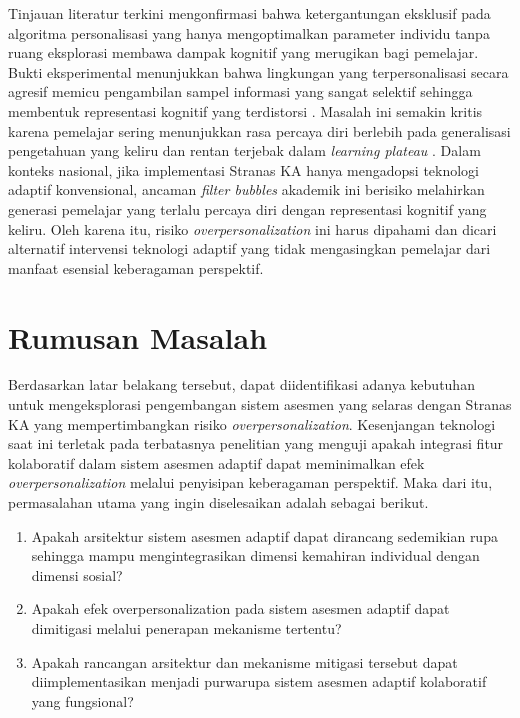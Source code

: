 Tinjauan literatur terkini mengonfirmasi bahwa ketergantungan eksklusif pada
algoritma personalisasi yang hanya mengoptimalkan parameter individu tanpa ruang
eksplorasi membawa dampak kognitif yang merugikan bagi pemelajar. Bukti
eksperimental menunjukkan bahwa lingkungan yang terpersonalisasi secara agresif
memicu pengambilan sampel informasi yang sangat selektif sehingga membentuk
representasi kognitif yang terdistorsi \autocite{Bahg2025}. Masalah ini semakin
kritis karena pemelajar sering menunjukkan rasa percaya diri berlebih pada generalisasi
pengetahuan yang keliru dan rentan terjebak dalam \textit{learning plateau}
\autocite{Bahg2025, Halkiopoulos2024}. Dalam konteks nasional, jika implementasi Stranas KA hanya mengadopsi teknologi adaptif konvensional, ancaman \textit{filter
bubbles} akademik ini berisiko melahirkan generasi pemelajar yang terlalu percaya diri dengan representasi kognitif yang keliru.
Oleh karena itu, risiko \textit{overpersonalization} ini harus dipahami dan dicari alternatif
intervensi teknologi adaptif yang tidak mengasingkan pemelajar dari manfaat esensial
keberagaman perspektif.

\section{Rumusan Masalah}
\label{sec:rumusan_masalah}
Berdasarkan latar belakang tersebut, dapat diidentifikasi adanya kebutuhan untuk
mengeksplorasi pengembangan sistem asesmen yang selaras dengan Stranas KA yang
mempertimbangkan risiko \textit{overpersonalization}. Kesenjangan teknologi saat ini terletak pada terbatasnya
penelitian yang menguji apakah integrasi fitur kolaboratif dalam sistem asesmen
adaptif dapat meminimalkan efek \textit{overpersonalization} melalui penyisipan keberagaman perspektif.
Maka dari itu, permasalahan utama yang ingin diselesaikan adalah sebagai berikut.
\begin{enumerate}
  \item Apakah arsitektur sistem asesmen adaptif dapat dirancang sedemikian rupa sehingga mampu mengintegrasikan dimensi kemahiran individual dengan dimensi sosial?
  \item Apakah efek overpersonalization pada sistem asesmen adaptif dapat dimitigasi melalui penerapan mekanisme tertentu?
  \item Apakah rancangan arsitektur dan mekanisme mitigasi tersebut dapat diimplementasikan menjadi purwarupa sistem asesmen adaptif kolaboratif yang fungsional?
\end{enumerate}

